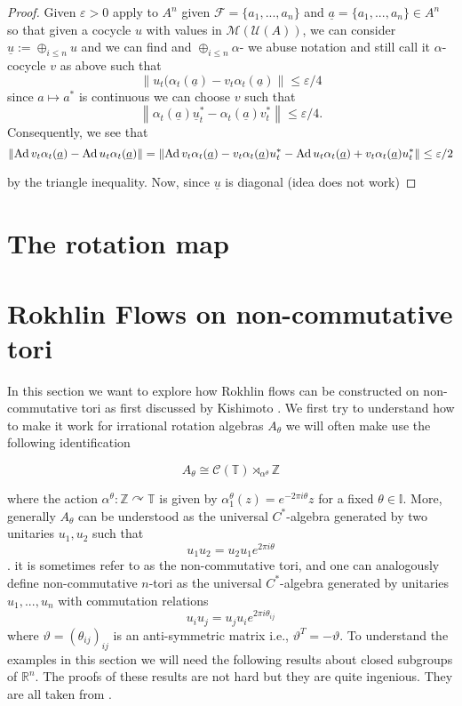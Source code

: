 \documentclass[11pt,a4paper,oneside]{amsart}
\newcommand{\Ad}{{\rm Ad\,}}
\newcommand{\norm}[1]{\left\|#1\right\|} %
\newcommand{\acts}{\curvearrowright}
\begin{document}
\begin{proof}

Given $\varepsilon>0$ apply \cite[Theorem 1.1]{kishimoto2006multiplier} to $A^n$ given $\mathcal F=\{a_1,...,a_n\}$ and $\underline{a}=\{a_1,...,a_n\}\in A^n$ so that given a cocycle $u$ with values in $\mathcal M(\mathcal U(A))$, we can consider $\underline u:=\oplus_{i\leq n} u$ and we can find and $\oplus_{i\leq n}\alpha$- we abuse notation and still call it $\alpha$- cocycle $v$ as above such that \[\norm{u_t(\alpha_t(\underline a)-v_t \alpha_t(\underline a)}\leq \varepsilon/4\] since $a\mapsto a^*$ is continuous we can choose $v$ such that \[\norm{\alpha_t(\underline a) \underline u_t^*-\alpha_t(\underline a) v^*_t}\leq \varepsilon/4.\] Consequently, we see that \[\norm{\Ad v_t \alpha_t(\underline a)- \Ad u_t \alpha_t(\underline a)}=\norm{\Ad v_t \alpha_t(\underline a)- v_t\alpha_t(\underline a)u_t^*- \Ad u_t \alpha_t(\underline a)+v_t\alpha_t(\underline a)u^*_t}\leq \varepsilon/2 \]

by the triangle inequality. Now, since $\underline u$ is diagonal (idea does not work) 
\end{proof}



\section{The rotation map}




\section{Rokhlin Flows on non-commutative tori}

In this section we want to explore how Rokhlin flows can be constructed on non-commutative tori as first discussed by Kishimoto \cite{kishimoto1996rokhlin}. We first try to understand how to make it work for irrational rotation algebras $A_{\theta}$ 
we will often make use the following identification 


 \[A_\theta\cong \mathcal C (\mathbb T)\rtimes_{\alpha^\theta} \mathbb Z\]

where the action $\alpha^{\theta}: \mathbb Z\acts \mathbb T$ is given by $\alpha^\theta_1(z)=e^{-2\pi i \theta}z$ for a fixed $\theta\in \mathbb I$. More, generally $A_\theta$ can be understood as the universal $C^*$-algebra generated by two unitaries $u_1, u_2$ such that $$u_1u_2=u_2u_1e^{2\pi i \theta}$$. it is sometimes refer to as the non-commutative tori, and one can analogously define  non-commutative $n$-tori as the universal $C^*$-algebra generated by unitaries $u_1,..., u_n$ with commutation relations \[u_iu_j=u_ju_ie^{2\pi i \theta_{ij}}\] where $ \vartheta=(\theta_{ij})_{ij}$ is an anti-symmetric matrix i.e., $\vartheta^T=-\vartheta$. To understand the examples in this section we will need the following results about closed subgroups of $\mathbb{R}^n$. The proofs of these results are not hard but they are quite ingenious. They are all taken from \cite[Chapter VII]{bourbaki1966elements}.
\end{document}
